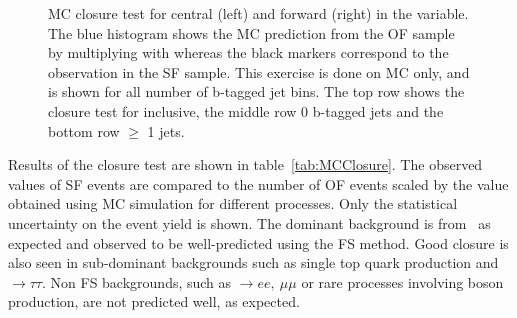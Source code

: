 \begin{figure}[htb]
\begin{center}
\begin{tabular}{cc}
    \end{tabular}
    \caption{
      MC closure test for central (left) and forward (right) in the \mll variable.
      The blue histogram shows the MC prediction from the OF sample by multiplying
      with \rsfof whereas the black markers correspond to the observation in the SF sample.
      This exercise is done on \ttbar MC only, and is shown for all number of b-tagged jet bins.
      The top row shows the closure test for inclusive,
      the middle row 0 b-tagged jets and the bottom row $\geq$ 1 jets.
    }
    \label{fig:closureFS}
  \end{center}
\end{figure}

Results of the closure test are shown in table~\ref{tab:MCClosure}.
The observed values of SF events are compared to the number of
OF events scaled by the \rsfof value obtained using MC simulation for different processes.
Only the statistical uncertainty on the event yield is shown.
The dominant background is from \ttbar\ as expected and observed to be well-predicted using the FS method.
Good closure is also seen in sub-dominant backgrounds such as single top quark production and \DYjets $\rightarrow \tau\tau$.
Non FS backgrounds, such as \DYjets $\rightarrow ee,~\mu\mu$ or rare processes involving \Z boson production,
are not predicted well, as expected.

